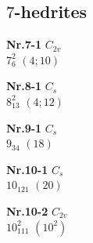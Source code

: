 \documentclass[12pt]{article}
\begin{document}
\subsection{$7$-hedrites}\label{subsection-7-hedrites}
{\small
\setlength{\unitlength}{1cm}
\begin{minipage}[t]{3.5cm}
\centering
\epsfxsize=2.5cm
\par
{{\bf Nr.7-1} \quad $C_{2v}$\\ $7^2_{6}$ \quad $(4;10)$\\\vspace{3mm} }
\end{minipage}
\setlength{\unitlength}{1cm}
\begin{minipage}[t]{3.5cm}
\centering
\epsfxsize=2.5cm
\par
{{\bf Nr.8-1} \quad $C_{s}$\\ $8^2_{13}$ \quad $(4;12)$\\\vspace{3mm} }
\end{minipage}
\setlength{\unitlength}{1cm}
\begin{minipage}[t]{3.5cm}
\centering
\epsfxsize=2.5cm
\par
{{\bf Nr.9-1} \quad $C_{s}$\\ $9_{34}$ \quad $(18)$\\\vspace{3mm} }
\end{minipage}
\setlength{\unitlength}{1cm}
\begin{minipage}[t]{3.5cm}
\centering
\epsfxsize=2.5cm
\par
{{\bf Nr.10-1} \quad $C_{s}$\\ $10_{121}$ \quad $(20)$\\\vspace{3mm} }
\end{minipage}
\setlength{\unitlength}{1cm}
\begin{minipage}[t]{3.5cm}
\centering
\epsfxsize=2.5cm
\par
{{\bf Nr.10-2} \quad $C_{2v}$\\ $10^2_{111}$ \quad $(10^2)$\\\vspace{3mm} }
\end{minipage}
\setlength{\unitlength}{1cm}
\begin{minipage}[t]{3.5cm}
\centering
\epsfxsize=2.5cm
\par

\end{minipage}}
\end{document}
